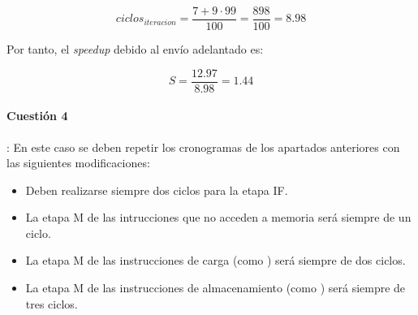 \[
ciclos_{iteracion} = \frac{7 + 9 \cdot 99}{100} = \frac{898}{100} = 8.98
\]

Por tanto, el \emph{speedup} debido al envío adelantado es:

\[
S = \frac{12.97}{8.98} = 1.44
\]

\paragraph{Cuestión 4}: En este caso se deben repetir los cronogramas de los apartados anteriores
con las siguientes modificaciones:
\begin{itemize}
  \item Deben realizarse siempre dos ciclos para la etapa IF.
  \item La etapa M de las intrucciones que no acceden a memoria será siempre de un ciclo.
  \item La etapa M de las instrucciones de carga (como ) será siempre de dos ciclos.
  \item La etapa M de las instrucciones de almacenamiento (como ) será siempre de tres ciclos.
\end{itemize}
